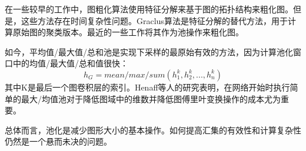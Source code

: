 在一些较早的工作中，图粗化算法使用特征分解来基于图的拓扑结构来粗化图。但是，这些方法存在时间复杂性问题。Graclus算法是特征分解的替代方法，用于计算原始图的聚类版本。最近的一些工作将其作为池操作来粗化图。

如今，平均值/最大值/总和池是实现下采样的最原始有效的方法，因为计算池化窗口中的均值/最大值/总和值很快：
\[
h_G=mean/max/sum(h_1^{k},h_2^{k},...,h_n^{k})
\]
其中K是最后一个图卷积层的索引。Henaff等人的研究\cite{henaff2015deep}表明，在网络开始时执行简单的最大/均值池对于降低图域中的维数并降低图傅里叶变换操作的成本尤为重要。

总体而言，池化是减少图形大小的基本操作。如何提高汇集的有效性和计算复杂性仍然是一个悬而未决的问题。